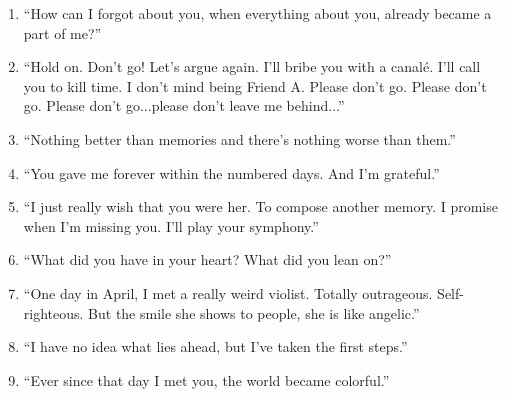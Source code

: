 \documentclass{book}
\numberwithin{equation}{section}
\begin{document}
\begin{enumerate}
    \item ``How can I forgot about you, when everything about you, already became a part of me?''
    \item ``Hold on. Don't go! Let's argue again. I'll bribe you with a canalé. I'll call you to kill time. I don't mind being Friend A. Please don't go. Please don't go. Please don't go...please don't leave me behind...''
    \item ``Nothing better than memories and there's nothing worse than them.''
    \item ``You gave me forever within the numbered days. And I'm grateful.''
    \item ``I just really wish that you were her. To compose another memory. I promise when I'm missing you. I'll play your symphony.''
    \item ``What did you have in your heart? What did you lean on?''
    \item ``One day in April, I met a really weird violist. Totally outrageous. Self-righteous. But the smile she shows to people, she is like angelic.''
    \item ``I have no idea what lies ahead, but I've taken the first steps.''
    \item ``Ever since that day I met you, the world became colorful.''
\end{enumerate}
\end{document}

